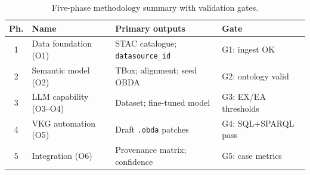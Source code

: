 \begin{table}[t]
  \centering
  \caption{Five-phase methodology summary with validation gates.}
  \label{tab:phases}
  \scriptsize
  \begin{tabular}{clp{3.8cm}p{3.2cm}}
    \toprule
    Ph. & Name & Primary outputs & Gate \\
    \midrule
    1 & Data foundation (O1) & STAC catalogue; \texttt{datasource\_id} & G1: ingest OK \\
    2 & Semantic model (O2) & TBox; alignment; seed OBDA & G2: ontology valid \\
    3 & LLM capability (O3--O4) & Dataset; fine-tuned model & G3: EX/EA thresholds \\
    4 & VKG automation (O5) & Draft \texttt{.obda} patches & G4: SQL+SPARQL pass \\
    5 & Integration (O6) & Provenance matrix; confidence & G5: case metrics \\
    \bottomrule
  \end{tabular}
\end{table}
